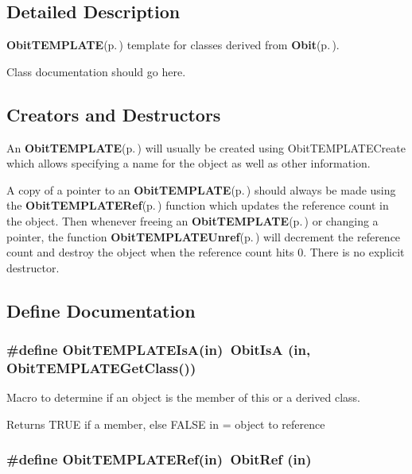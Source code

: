 \subsection{Detailed Description}
{\bf Obit\-TEMPLATE}{\rm (p.\,\pageref{structObitTEMPLATE})} template for classes derived from {\bf Obit}{\rm (p.\,\pageref{structObit})}. 

Class documentation should go here.\subsection{Creators and Destructors}\label{ObitTEMPLATE_8h_ObitTEMPLATEaccess}
An {\bf Obit\-TEMPLATE}{\rm (p.\,\pageref{structObitTEMPLATE})} will usually be created using Obit\-TEMPLATECreate which allows specifying a name for the object as well as other information.

A copy of a pointer to an {\bf Obit\-TEMPLATE}{\rm (p.\,\pageref{structObitTEMPLATE})} should always be made using the {\bf Obit\-TEMPLATERef}{\rm (p.\,\pageref{ObitTEMPLATE_8h_a1})} function which updates the reference count in the object. Then whenever freeing an {\bf Obit\-TEMPLATE}{\rm (p.\,\pageref{structObitTEMPLATE})} or changing a pointer, the function {\bf Obit\-TEMPLATEUnref}{\rm (p.\,\pageref{ObitTEMPLATE_8h_a0})} will decrement the reference count and destroy the object when the reference count hits 0. There is no explicit destructor.

\subsection{Define Documentation}
\subsubsection{\setlength{\rightskip}{0pt plus 5cm}\#define Obit\-TEMPLATEIs\-A(in)\ Obit\-Is\-A (in, Obit\-TEMPLATEGet\-Class())}\label{ObitTEMPLATE_8h_a2}


Macro to determine if an object is the member of this or a derived class. 

Returns TRUE if a member, else FALSE in = object to reference 
\subsubsection{\setlength{\rightskip}{0pt plus 5cm}\#define Obit\-TEMPLATERef(in)\ Obit\-Ref (in)}\label{ObitTEMPLATE_8h_a1}



